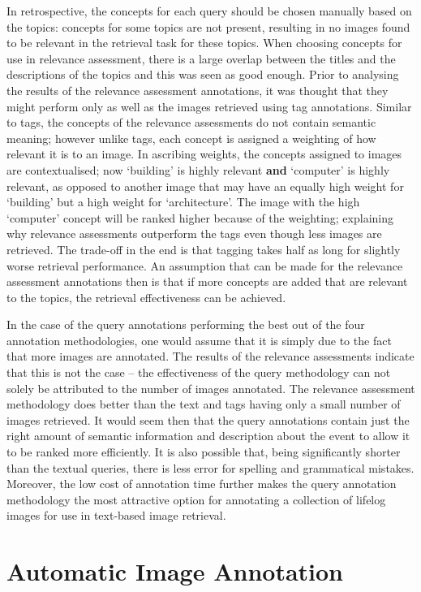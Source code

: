In retrospective, the concepts for each query should be chosen manually based on the topics: concepts for some topics are not present, resulting in no images found to be relevant in the retrieval task for these topics. When choosing concepts for use in relevance assessment, there is a large overlap between the titles and the descriptions of the topics and this was seen as good enough. Prior to analysing the results of the relevance assessment annotations, it was thought that they might perform only as well as the images retrieved using tag annotations. Similar to tags, the concepts of the relevance assessments do not contain semantic meaning; however unlike tags, each concept is assigned a weighting of how relevant it is to an image. In ascribing weights, the concepts assigned to images are contextualised; now `building' is highly relevant \textbf{and} `computer' is highly relevant, as opposed to another image that may have an equally high weight for `building' but a high weight for `architecture'. The image with the high `computer' concept will be ranked higher because of the weighting; explaining why relevance assessments outperform the tags even though less images are retrieved. The trade-off in the end is that tagging takes half as long for slightly worse retrieval performance. An assumption that can be made for the relevance assessment annotations then is that if more concepts are added that are relevant to the topics, the retrieval effectiveness can be achieved.

In the case of the query annotations performing the best out of the four annotation methodologies, one would assume that it is simply due to the fact that more images are annotated. The results of the relevance assessments indicate that this is not the case -- the effectiveness of the query methodology can not solely be attributed to the number of images annotated. The relevance assessment methodology does better than the text and tags having only a small number of images retrieved. It would seem then that the query annotations contain just the right amount of semantic information and description about the event to allow it to be ranked more efficiently. It is also possible that, being significantly shorter than the textual queries, there is less error for spelling and grammatical mistakes. Moreover, the low cost of annotation time further makes the query annotation methodology the most attractive option for annotating a collection of lifelog images for use in text-based image retrieval.

\section{Automatic Image Annotation}

